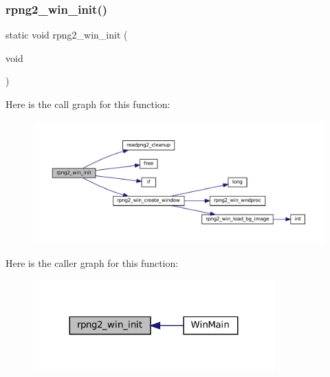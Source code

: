 \subsubsection{\texorpdfstring{rpng2\+\_\+win\+\_\+init()}{rpng2\_win\_init()}}
{\footnotesize\ttfamily static void rpng2\+\_\+win\+\_\+init (\begin{DoxyParamCaption}\item[{void}]{ }\end{DoxyParamCaption})\hspace{0.3cm}{\ttfamily [static]}}

Here is the call graph for this function\+:
\nopagebreak
\begin{figure}[H]
\begin{center}
\leavevmode
\includegraphics[width=350pt]{rpng2-win_8c_a47fb2441423f2e30f4cfe4f427159e70_cgraph}
\end{center}
\end{figure}
Here is the caller graph for this function\+:
\nopagebreak
\begin{figure}[H]
\begin{center}
\leavevmode
\includegraphics[width=263pt]{rpng2-win_8c_a47fb2441423f2e30f4cfe4f427159e70_icgraph}
\end{center}
\end{figure}
\mbox{\label{rpng2-win_8c_a36ca0b965012c0dda68b0bd0485a70e5}} 
